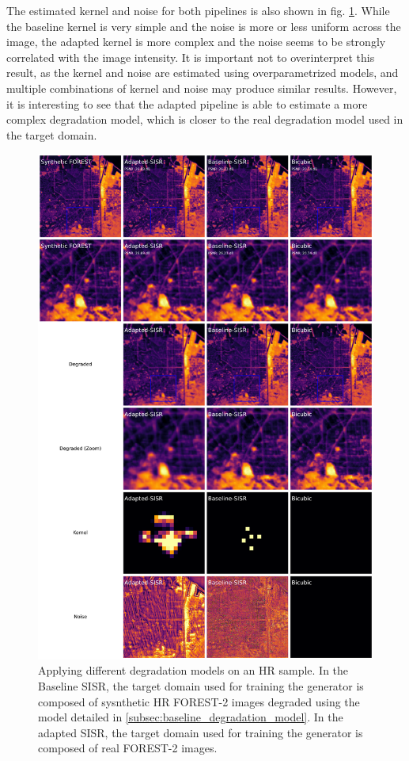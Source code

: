         The estimated kernel and noise for both pipelines is also shown in fig. \ref{fig:5-source_domain_sample}. 
        While the baseline kernel is very simple and the noise is more or less uniform across the image, the adapted kernel is more complex and the noise seems to be strongly correlated with the image intensity.
        It is important not to overinterpret this result, as the kernel and noise are estimated using overparametrized models, and multiple combinations of kernel and noise may produce similar results. 
        However, it is interesting to see that the adapted pipeline is able to estimate a more complex degradation model, which is closer to the real degradation model used in the target domain.

        \begin{figure}[H]
            \centering
            \includegraphics[width=\textwidth]{Includes/5-source_prediction-sample.pdf}
            \caption{Applying different degradation models on an HR sample. 
                    In the Baseline SISR, the target domain used for training the generator is composed of sysnthetic HR FOREST-2 images degraded using the model detailed in \ref{subsec:baseline_degradation_model}.
                    In the adapted SISR, the target domain used for training the generator is composed of real FOREST-2 images.}
            \label{fig:5-source_domain_sample}
        \end{figure}
        \pagebreak

